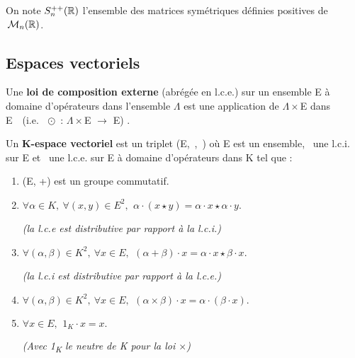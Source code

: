\begin{small}
    On note \(S_n^{++}(\mathbb{R})\) l'ensemble des matrices symétriques définies positives de \(\,\mathcal{M}_n(\mathbb{R})\).
\end{small}


\vspace{2.1cm}

\subsection{Espaces vectoriels}

\vspace{0.8cm}

Une \textbf{loi de composition externe} (abrégée en l.c.e.) sur un ensemble E à domaine d'opérateurs dans l'ensemble \(\Lambda\) est une application de \(\Lambda \times\)E dans E\ \ (i.e.\ \(\ \odot\) : \(\Lambda\times\)E \(\to\) E) .

\vspace{1.5cm}

Un \textbf{K-espace vectoriel} est un triplet (E,\ \lci,\ \lce ) où E est un ensemble, \lci\, une l.c.i. sur E et \lce \ une l.c.e. sur E à domaine d'opérateurs dans K tel que : \vspace{-0.1cm}
\begin{enumerate}[leftmargin=2cm]
    \item (E, +) est un groupe commutatif. \vspace{0.1cm}
    
    \item \(\forall \alpha \in K, \ \forall (x,y)\in E^2,\ \, \alpha \cdot (x\star y) = \alpha \cdot x \star \alpha \cdot y.\) \\
    \begin{small}\emph{(la l.c.e est distributive par rapport à la l.c.i.)}\end{small} \vspace{0.1cm}
    
    \item \( \forall(\alpha, \beta)\in K^2,\ \forall x\in E,\  \,(\alpha + \beta) \cdot x = \alpha \cdot x \star \beta \cdot x \). \\
    \begin{small}\emph{(la l.c.i est distributive par rapport à la l.c.e.)}\end{small} \vspace{0.1cm}
    
    \item \( \forall(\alpha, \beta)\in K^2,\ \forall x\in E,\  \,(\alpha \times \beta)\cdot x= \alpha \cdot (\beta \cdot x). \) \vspace{0.1cm}
    
    \item \(\forall x\in E,\ \,1_K \cdot x = x. \) \\
     \begin{small}\emph{(Avec 1\textsubscript{K} le neutre de K pour la loi \(\times\))}\end{small}
\end{enumerate}

